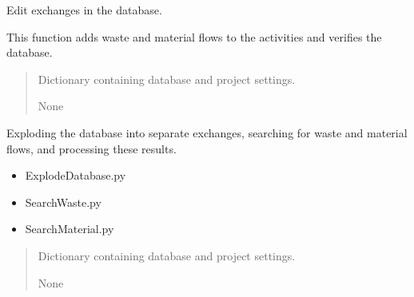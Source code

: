\documentclass[letterpaper,10pt,english]{sphinxmanual}
\begin{document}
\begin{fulllineitems}
\label{\detokenize{WMFootprint_api:WasteAndMaterialFootprint.main.EditExchanges}}
\pysigstartsignatures
{}
\pysigstopsignatures
\sphinxAtStartPar
Edit exchanges in the database.

\sphinxAtStartPar
This function adds waste and material flows to the activities and verifies the database.
\begin{quote}\begin{description}
\sphinxAtStartPar
{} \textendash{} Dictionary containing database and project settings.

\sphinxAtStartPar
None

\end{description}\end{quote}

\end{fulllineitems}


\begin{fulllineitems}
\label{\detokenize{WMFootprint_api:WasteAndMaterialFootprint.main.ExplodeAndSearch}}
\pysigstartsignatures
{}
\pysigstopsignatures
\sphinxAtStartPar
Exploding the database into separate exchanges, searching for waste and
material flows, and processing these results.
\begin{description}
\begin{itemize}
\item {} 
\sphinxAtStartPar
ExplodeDatabase.py

\item {} 
\sphinxAtStartPar
SearchWaste.py

\item {} 
\sphinxAtStartPar
SearchMaterial.py

\end{itemize}

\end{description}
\begin{quote}\begin{description}
\sphinxAtStartPar
{} \textendash{} Dictionary containing database and project settings.

\sphinxAtStartPar
None

\end{description}\end{quote}

\end{fulllineitems}
\end{document}
